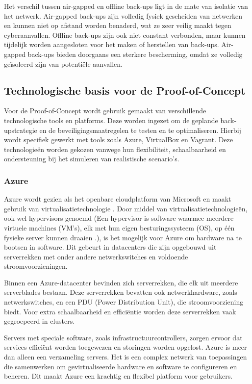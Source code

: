 Het verschil tussen air-gapped en offline back-ups ligt in de mate van isolatie van het netwerk. Air-gapped back-ups zijn volledig fysiek gescheiden van netwerken en kunnen niet op afstand worden benaderd, wat ze zeer veilig maakt tegen cyberaanvallen. Offline back-ups zijn ook niet constant verbonden, maar kunnen tijdelijk worden aangesloten voor het maken of herstellen van back-ups. Air-gapped back-ups bieden doorgaans een sterkere bescherming, omdat ze volledig geïsoleerd zijn van potentiële aanvallen.

\subsection{Technologische basis voor de Proof-of-Concept}
Voor de Proof-of-Concept wordt gebruik gemaakt van verschillende technologische tools en platforms. Deze worden ingezet om de geplande back-upstrategie en de beveiligingsmaatregelen te testen en te optimaliseren. Hierbij wordt specifiek gewerkt met tools zoals Azure, VirtualBox en Vagrant. Deze technologieën worden gekozen vanwege hun flexibiliteit, schaalbaarheid en ondersteuning bij het simuleren van realistische scenario's.
\subsubsection{Azure}
Azure wordt gezien als het openbare cloudplatform van Microsoft en maakt gebruik van virtualisatietechnologie \autocite{Ekuan2023}. Door middel van virtualisatietechnologieën, ook wel hypervisors genoemd (Een hypervisor is software waarmee meerdere virtuele machines (VM's), elk met hun eigen besturingssysteem (OS), op één fysieke server kunnen draaien \autocite{Susnjara2024}.), is het mogelijk voor Azure om hardware na te bootsen in software. Dit gebeurt in datacenters die zijn opgebouwd uit serverrekken met onder andere netwerkswitches en voldoende stroomvoorzieningen. 

Binnen een Azure-datacenter bevinden zich serverrekken, die elk uit meerdere serverblades bestaan. Deze serverrekken bevatten ook netwerkhardware, zoals netwerkswitches, en een PDU (Power Distribution Unit), die stroomvoorziening biedt. Voor extra schaalbaarheid en efficiëntie worden deze serverrekken vaak gegroepeerd in clusters. 

Servers met speciale software, zoals infrastructuurcontrollers, zorgen ervoor dat services efficiënt worden toegewezen en storingen worden opgelost. Azure is meer dan alleen een verzameling servers. Het is een complex netwerk van toepassingen die samenwerken om gevirtualiseerde hardware en software te configureren en beheren. Dit maakt Azure een krachtig en flexibel platform voor gebruikers.

